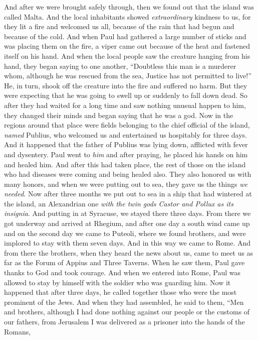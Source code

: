 \begin{biblechapter} %
 And after we were brought safely through, then we found out that the island was called Malta.
\verse And the local inhabitants showed \textit{extraordinary} kindness to us, for they lit a fire and welcomed us all, because of the rain that had begun and because of the cold.
\verse And when Paul had gathered a large number of sticks and was placing them on the fire, a viper came out because of the heat and fastened itself on his hand.
\verse And when the local people saw the creature hanging from his hand, they began saying to one another, “Doubtless this man is a murderer whom, although he was rescued from the sea, Justice has not permitted to live!”
\verse He, in turn, shook off the creature into the fire and suffered no harm.
\verse But they were expecting that he was going to swell up or suddenly to fall down dead. So after they had waited for a long time and saw nothing unusual happen to him, they changed their minds and began saying that he was a god.
\verse Now in the regions around that place were fields belonging to the chief official of the island, \textit{named} Publius, who welcomed us and entertained us hospitably for three days.
\verse And it happened that the father of Publius was lying down, afflicted with fever and dysentery. Paul went to \textit{him} and after praying, he placed his hands on him and healed him.
\verse And after this had taken place, the rest of those on the island who had diseases were coming and being healed also.
\verse They also honored us with many honors, and when we were putting out to sea, they gave us the things \textit{we needed}.
 Now after three months we put out to sea in a ship that had wintered at the island, an Alexandrian one \textit{with the twin gods Castor and Pollux as its insignia}.
\verse And putting in at Syracuse, we stayed there three days.
\verse From there we got underway and arrived at Rhegium, and after one day a south wind came up and on the second day we came to Puteoli,
\verse where we found brothers, and were implored to stay with them seven days. And in this way we came to Rome.
\verse And from there the brothers, when they heard the news about us, came to meet us as far as the Forum of Appius and Three Taverns. When he saw them, Paul gave thanks to God and took courage.
\verse And when we entered into Rome, Paul was allowed to stay by himself with the soldier who was guarding him.
 Now it happened that after three days, he called together those who were the most prominent of the Jews. And when they had assembled, he said to them, “Men and brothers, although I had done nothing against our people or the customs of our fathers, from Jerusalem I was delivered as a prisoner into the hands of the Romans,

\end{biblechapter}
